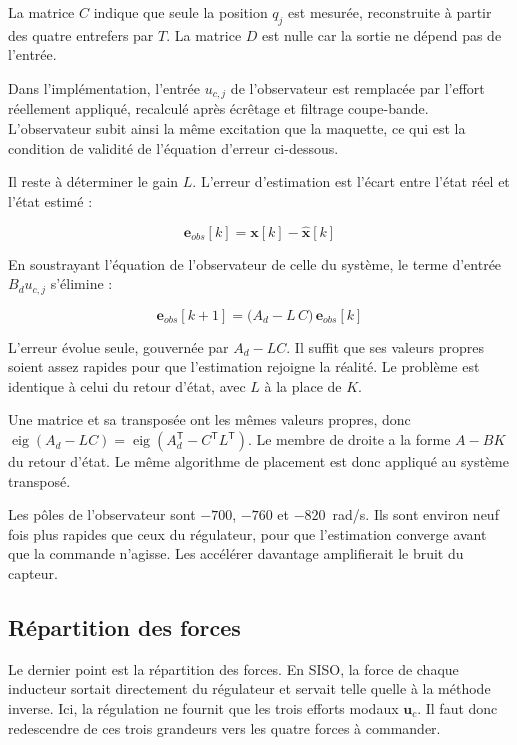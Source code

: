 La matrice $C$ indique que seule la position $q_j$ est mesurée, reconstruite à partir des quatre entrefers par $T$. La matrice $D$ est nulle car la sortie ne dépend pas de l'entrée.

Dans l'implémentation, l'entrée $u_{c,j}$ de l'observateur est remplacée par l'effort réellement appliqué, recalculé après écrêtage et filtrage coupe-bande. L'observateur subit ainsi la même excitation que la maquette, ce qui est la condition de validité de l'équation d'erreur ci-dessous.

Il reste à déterminer le gain $L$. L'erreur d'estimation est l'écart entre l'état réel et l'état estimé :

\begin{equation}
    \boldsymbol e_{obs}[k] = \boldsymbol x[k] - \hat{\boldsymbol x}[k]
\end{equation}

En soustrayant l'équation de l'observateur de celle du système, le terme d'entrée $B_d u_{c,j}$ s'élimine :

\begin{equation}
    \boldsymbol e_{obs}[k+1] = \bigl(A_d - L\,C\bigr)\,\boldsymbol e_{obs}[k]
    \label{eq:erreur-obs}
\end{equation}

L'erreur évolue seule, gouvernée par $A_d - L C$. Il suffit que ses valeurs propres soient assez rapides pour que l'estimation rejoigne la réalité. Le problème est identique à celui du retour d'état, avec $L$ à la place de $K$.

Une matrice et sa transposée ont les mêmes valeurs propres, donc $\operatorname{eig}(A_d - L C) = \operatorname{eig}(A_d^{\mathsf T} - C^{\mathsf T} L^{\mathsf T})$. Le membre de droite a la forme $A - BK$ du retour d'état. Le même algorithme de placement est donc appliqué au système transposé.

Les pôles de l'observateur sont $-700$, $-760$ et $-820$~rad/s. Ils sont environ neuf fois plus rapides que ceux du régulateur, pour que l'estimation converge avant que la commande n'agisse. Les accélérer davantage amplifierait le bruit du capteur.

\subsection{Répartition des forces}
\label{subsec:RepartitionForces}
Le dernier point est la répartition des forces. En SISO, la force de chaque inducteur sortait directement du régulateur et servait telle quelle à la méthode inverse. Ici, la régulation ne fournit que les trois efforts modaux $\boldsymbol u_c$. Il faut donc redescendre de ces trois grandeurs vers les quatre forces à commander.

